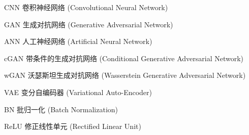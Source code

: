 \begin{denotation}[3cm]
\item[CNN] 卷积神经网络 (Convolutional Neural Network)
\item[GAN] 生成对抗网络 (Generative Adversarial Network)
\item[ANN] 人工神经网络 (Artificial Neural Network)
\item[cGAN] 带条件的生成对抗网络 (Conditional Generative Adversarial Network)
\item[wGAN] 沃瑟斯坦生成对抗网络 (Wasserstein Generative Adversarial Network)
\item[VAE] 变分自编码器 (Variational Auto-Encoder)
\item[BN] 批归一化 (Batch Normalization)
\item[ReLU] 修正线性单元 (Rectified Linear Unit)
\end{denotation}
